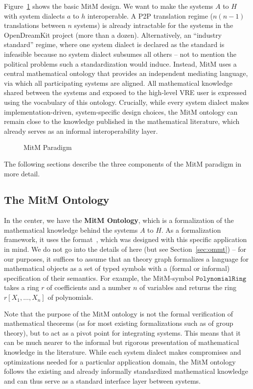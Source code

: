 
Figure~\ref{fig:mitm} shows the basic MitM design.
We want to make the systems $A$ to $H$ with system dialects $a$ to $h$ interoperable.
A P2P translation regime ($n(n-1)$ translations between $n$ systems) is already intractable for the systems in the OpenDreamKit project (more than a dozen).
Alternatively, an ``industry standard'' regime, where one system dialect is declared as the standard is infeasible because no system dialect subsumes all others -- not to mention the political problems such a standardization would induce.
Instead, MitM uses a central mathematical ontology that provides an independent mediating language, via which all participating systems are aligned.
All mathematical knowledge shared between the systems and exposed to the high-level VRE user is expressed using the vocabulary of this ontology.
Crucially, while every system dialect makes implementation-driven, system-specific design choices, the MitM ontology can remain close to the knowledge published in the mathematical literature, which already serves as an informal interoperability layer.

\begin{figure}[ht]\centering
  \caption{MitM Paradigm}\label{fig:mitm}
\end{figure}

The following sections describe the three components of the MitM paradigm in more detail.

\subsection{The MitM Ontology}\label{sec:mitm:recap}

In the center, we have the \textbf{MitM Ontology}, which is a formalization of the mathematical knowledge behind the systems $A$ to $H$.
As a formalization framework, it uses the \OMMT format~\cite{Kohlhase:OMDoc1.2,RabKoh:WSMSML13,uniformal:on}, which was designed with this specific application in mind.
We do not go into the details of \OMMT here (but see Section~\ref{sec:ommt}) -- for our purposes, it suffices to assume that an \OMMT theory graph formalizes a language for mathematical objects as a set of typed symbols with a (formal or informal) specification of their semantics.
For example, the MitM-symbol $\mathtt{PolynomialRing}$ takes a ring $r$ of coefficients and a number $n$ of variables and returns the ring $r[X_1,\ldots,X_n]$ of polynomials.

Note that the purpose of the MitM ontology is not the formal verification of mathematical theorems (as for most existing formalizations such as \cite{Gonthier+:mcpoot13} of group theory), but to act as a pivot point for integrating systems.
This means that it can be much nearer to the informal but rigorous presentation of mathematical knowledge in the literature.
While each system dialect makes compromises and optimizations needed for a particular application domain, the MitM ontology follows the existing and already informally standardized mathematical knowledge and can thus serve as a standard interface layer between systems.

